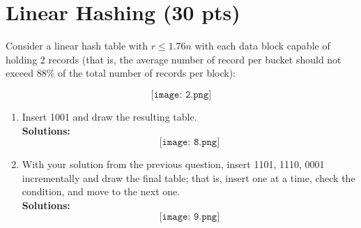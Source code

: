 \documentclass[paper=a4, fontsize=11pt]{scrartcl}
\numberwithin{equation}{section}		%
\numberwithin{figure}{section}			%
\numberwithin{table}{section}				%
\begin{document}
	
	
	\section{Linear Hashing (30 pts)}
	
	Consider a linear hash table with $r \leq 1.76n$ with each data block capable of holding 2 records (that is, the average number of record per bucket should not exceed $88\%$ of the total number of records per block):
	
	\[
	\texttt{[image: 2.png]}
	\]
	
	\begin{enumerate}
		\item Insert 1001 and draw the resulting table.\\
		\textbf{Solutions: }
		\[
		\texttt{[image: 8.png]}
		\]
		
		\item With your solution from the previous question, insert 1101, 1110, 0001 incrementally and draw the final table; that is, insert one at a time, check the condition, and move to the next one.\\
		\textbf{Solutions: }
		\[
		\texttt{[image: 9.png]}
		\]
		
	\end{enumerate}
	
	
	
	
	
\end{document}
